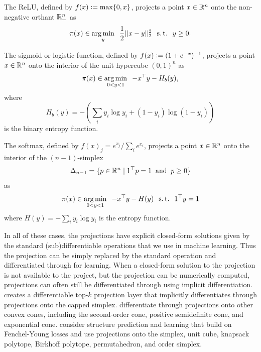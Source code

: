 \documentclass[twoside,11pt]{article}
\begin{document}
\begin{proposition}
  The ReLU, defined by $f(x) \vcentcolon= \max\{0, x\}$,
  projects a point $x\in\mathbb{R}^n$ onto the non-negative
  orthant $\mathbb{R}^n_+$ as
  \begin{equation}
    \pi(x) \in \operatorname*{arg\,min}_y \;\; \frac{1}{2}||x-y||_2^2 \;\; \operatorname*{s.t.} \;\; y\geq 0.
    \label{eq:relu-proj}
  \end{equation}
\end{proposition}

\begin{proposition}
  The sigmoid or logistic function, defined by $f(x) \vcentcolon= (1+e^{-x})^{-1}$,
  projects a point $x\in\mathbb{R}^n$ onto
  the interior of the unit hypercube $(0,1)^n$ as
  \begin{equation}
    \pi(x) \in \operatorname*{arg\,min}_{0<y<1} \;\; -x^\top y -H_b(y),
    \label{eq:sigmoid-proj}
  \end{equation}
  where
  \begin{equation}
  H_b(y) = - \left(\sum_i y_i\log y_i + (1-y_i)\log (1-y_i)\right)
  \end{equation}
  is the
  binary entropy function.
\end{proposition}

\begin{proposition}
  The softmax, defined by $f(x)_j = e^{x_j} / \sum_i e^{x_i}$,
  projects a point $x\in\mathbb{R}^n$ onto
  the interior of the $(n-1)$-simplex
  $$\Delta_{n-1}=\{p\in\mathbb{R}^n\; \vert\; 1^\top p = 1 \; \; {\rm and} \;\; p \geq 0 \}$$
  as
  \begin{equation}
    \pi(x) \in \operatorname*{arg\,min}_{0<y<1} \;\; -x^\top y - H(y) \;\; \operatorname*{s.t.}\;\; 1^\top y = 1
    \label{eq:simplex-proj}
  \end{equation}
  where $H(y) = -\sum_i y_i \log y_i$ is the entropy function.
\end{proposition}

In all of these cases, the projections have explicit closed-form
solutions given by the standard (sub)differentiable operations
that we use in machine learning.
Thus the projection can be simply replaced by the standard operation
and differentiated through for learning.
When a closed-form solution to the projection is not available to
the project, but the projection can be numerically computed,
projections can often still be differentiated through using
implicit differentiation.
\citet{amos2019limited} creates a differentiable top-$k$
projection layer that implicitly differentiates through projections
onto the capped simplex.
\citet{ali2017semismooth,busseti2019solution} differentiate
through projections onto other convex cones, including
the second-order cone, positive semidefinite cone,
and exponential cone.
\citet{blondel2019structured} consider structure prediction
and learning that build on Fenchel-Young losses
\citep{blondel2020learning} and use projections onto the
simplex, unit cube, knapsack polytope, Birkhoff polytope,
permutahedron, and order simplex.
\end{document}
